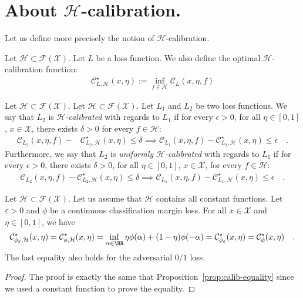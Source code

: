 \section{About $\mathcal{H}$-calibration.}

Let us  define more precisely the notion of $\mathcal{H}$-calibration.

\begin{defn}
Let $\mathcal{H}\subset \mathcal{F}(\mathcal{X})$. Let $L$ be a loss function. We also define the optimal $\mathcal{H}$-calibration function:
\begin{align*}
        \mathcal{C}^\star_{L,\mathcal{H}}(x,\eta):=\inf_{f\in\mathcal{H}}\mathcal{C}_L(x,\eta,f)
\end{align*}

\end{defn}



\begin{defn}
Let $\mathcal{H}\subset \mathcal{F}(\mathcal{X})$. Let $\mathcal{H}\subset \mathcal{F}(\mathcal{X})$. Let $L_1$ and $L_2$ be two loss functions. We say that $L_2$ is \emph{$\mathcal{H}$-calibrated} with regards to $L_1$ if for every $\epsilon>0$,  for all $\eta\in[0,1]$, $x\in\mathcal{X}$, there exists $ \delta>0$ for every $f\in\mathcal{H}$: 
\begin{align*}
    \mathcal{C}_{L_2}(x,\eta,f)- &\mathcal{C}^\star_{L_2,\mathcal{H}}(x,\eta)\leq\delta\implies\mathcal{C}_{L_1}(x,\eta,f)- \mathcal{C}^\star_{L_1,\mathcal{H}}(x,\eta)\leq \epsilon\quad.
\end{align*}
Furthermore, we say that $L_2$ is \emph{uniformly $\mathcal{H}$-calibrated} with regards to $L_1$ if for every $\epsilon>0$, there exists $ \delta>0$, for all $\eta\in[0,1]$, $x\in\mathcal{X}$, for every $f\in\mathcal{H}$: 
\begin{align*}
    \mathcal{C}_{L_2}(x,\eta,f)- \mathcal{C}^\star_{L_2,\mathcal{H}}(x,\eta)\leq\delta\implies\mathcal{C}_{L_1}(x,\eta,f)- \mathcal{C}^\star_{L_1,\mathcal{H}}(x,\eta)\leq \epsilon\quad.
\end{align*}
\end{defn}




\begin{prop*}
Let $\mathcal{H}\subset \mathcal{F}(\mathcal{X})$. Let us assume that $\mathcal{H}$ contains all constant functions. Let $\varepsilon>0$ and $\phi$ be a continuous classification margin loss.  For all $x\in\mathcal{X}$ and $\eta\in[0,1]$, we have
\begin{align*}
    \mathcal{C}^\star_{\phi_\varepsilon,\mathcal{H}}(x,\eta)=\mathcal{C}^\star_{\phi,\mathcal{H}}(x,\eta) =\inf_{\alpha\in\RR}\eta \phi(\alpha)+(1-\eta)\phi(-\alpha)= \mathcal{C}^\star_{\phi_\varepsilon}(x,\eta)=\mathcal{C}^\star_{\phi}(x,\eta)\quad.
\end{align*}
The last equality also holds for the adversarial $0/1$ loss.
\end{prop*}
\begin{proof}
The proof is exactly the same that Proposition~\ref{prop:calib-equality} since we used a constant function to prove the equality.
\end{proof}


